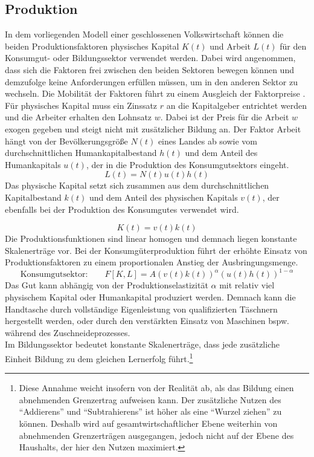 \subsection*{Produktion}
In dem vorliegenden Modell einer geschlossenen Volkswirtschaft können die beiden Produktionsfaktoren physisches Kapital $K(t)$ und Arbeit $L(t)$ für den Konsumgut- oder Bildungssektor verwendet werden. 
Dabei wird angenommen, dass sich die Faktoren frei zwischen den beiden Sektoren bewegen können und demzufolge keine Anforderungen erfüllen müssen, um in den anderen Sektor zu wechseln. Die Mobilität der Faktoren führt zu einem Ausgleich der Faktorpreise \cite{Samuelson.1941}. Für physisches Kapital muss ein Zinssatz $r$ an die Kapitalgeber entrichtet werden und die Arbeiter erhalten den Lohnsatz $w$. Dabei ist der Preis für die Arbeit $w$ exogen gegeben und steigt nicht mit zusätzlicher Bildung an. Der Faktor Arbeit hängt von der Bevölkerungsgröße $N(t)$ eines Landes ab sowie vom durchschnittlichen Humankapitalbestand $h(t)$ und dem Anteil des Humankapitals $u(t)$, der in die Produktion des Konsumgutsektors eingeht.
%
\begin{equation}
	L(t)=N(t)u(t)h(t)
	\label{eq:Arbeit}
\end{equation}
%
Das physische Kapital setzt sich zusammen aus dem durchschnittlichen Kapitalbestand $k(t)$ und dem Anteil des physischen Kapitals $v(t)$, der ebenfalls bei der Produktion des Konsumgutes verwendet wird. 

%
\begin{equation}
	K(t)=v(t)k(t)
	\label{eq:Kapital}
\end{equation}
%
Die Produktionsfunktionen sind linear homogen und demnach liegen konstante Skalenerträge vor. Bei der Konsumgüterproduktion führt der erhöhte Einsatz von Produktionsfaktoren zu einem proportionalen Anstieg der Ausbringungsmenge.
%
\begin{equation}
	\text{Konsumgutsektor:}\qquad F[K,L]= A(v(t)k(t))^\alpha(u(t)h(t))^{1-\alpha}
	\label{eq:ProduktionsfunktionK}
\end{equation}
%
Das Gut kann abhängig von der Produktionselastizität $\alpha$ mit relativ viel physischem Kapital oder Humankapital produziert werden. Demnach kann die Handtasche durch vollständige Eigenleistung von qualifizierten Täschnern hergestellt werden, oder durch den verstärkten Einsatz von Maschinen bspw. während des Zuschneideprozesses.\\
%
Im Bildungssektor bedeutet konstante Skalenerträge, dass jede zusätzliche Einheit Bildung zu dem gleichen Lernerfolg führt.\footnote{Diese Annahme weicht insofern von der Realität ab, als das Bildung einen abnehmenden Grenzertrag aufweisen kann. Der zusätzliche Nutzen des "`Addierens"' und "`Subtrahierens"' ist höher als eine "`Wurzel ziehen"' zu können. Deshalb wird auf gesamtwirtschaftlicher Ebene weiterhin von abnehmenden Grenzerträgen ausgegangen, jedoch nicht auf der Ebene des Haushalts, der hier den Nutzen maximiert.} 

